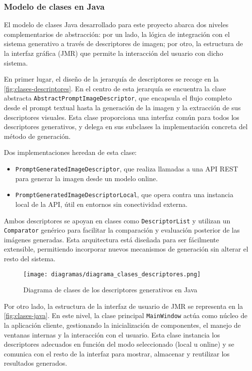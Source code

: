 \subsubsection{Modelo de clases en Java}

El modelo de clases Java desarrollado para este proyecto abarca dos niveles complementarios de abstracción: por un lado, la lógica de integración con el sistema generativo a través de descriptores de imagen; por otro, la estructura de la interfaz gráfica (JMR) que permite la interacción del usuario con dicho sistema.

\medskip

En primer lugar, el diseño de la jerarquía de descriptores se recoge en la \autoref{fig:clases-descriptores}. En el centro de esta jerarquía se encuentra la clase abstracta \texttt{AbstractPromptImageDescriptor}, que encapsula el flujo completo desde el prompt textual hasta la generación de la imagen y la extracción de sus descriptores visuales. Esta clase proporciona una interfaz común para todos los descriptores generativos, y delega en sus subclases la implementación concreta del método de generación.

Dos implementaciones heredan de esta clase:
\begin{itemize}
    \item \texttt{PromptGeneratedImageDescriptor}, que realiza llamadas a una API REST para generar la imagen desde un modelo online.
    \item \texttt{PromptGeneratedImageDescriptorLocal}, que opera contra una instancia local de la API, útil en entornos sin conectividad externa.
\end{itemize}

Ambos descriptores se apoyan en clases como \texttt{DescriptorList} y utilizan un \texttt{Comparator} genérico para facilitar la comparación y evaluación posterior de las imágenes generadas. Esta arquitectura está diseñada para ser fácilmente extensible, permitiendo incorporar nuevos mecanismos de generación sin alterar el resto del sistema.

\begin{figure}[H]
    \centering
    \texttt{[image: diagramas/diagrama\_clases\_descriptores.png]}
    \caption{Diagrama de clases de los descriptores generativos en Java}
    \label{fig:clases-descriptores}
\end{figure}

\medskip

Por otro lado, la estructura de la interfaz de usuario de JMR se representa en la \autoref{fig:clases-java}. En este nivel, la clase principal \texttt{MainWindow} actúa como núcleo de la aplicación cliente, gestionando la inicialización de componentes, el manejo de ventanas internas y la interacción con el usuario. Esta clase instancia los descriptores adecuados en función del modo seleccionado (local u online) y se comunica con el resto de la interfaz para mostrar, almacenar y reutilizar los resultados generados.

